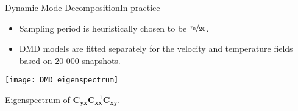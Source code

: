 \begin{frame}[t, c]{Dynamic Mode Decomposition}{In practice}
  \begin{minipage}{.68\textwidth}
    \begin{itemize}
    \item Sampling period is heuristically chosen to be \( \nicefrac{\tau_0}{20} \).
      
      \bigskip
      
    \item DMD models are fitted separately for the velocity and temperature fields based on 20 000 snapshots.
      
      
    \end{itemize}
  \end{minipage}%
  \hfill
  \begin{minipage}{.28\textwidth}
    \centering
    \texttt{[image: DMD\_eigenspectrum]}
    
    {\small
      Eigenspectrum of \( \bm{C}_{\bm{yx}} \bm{C}_{\bm{xx}}^{-1} \bm{C}_{\bm{xy}} \).
    }
  \end{minipage}
  
  \vspace{1cm}
\end{frame}

